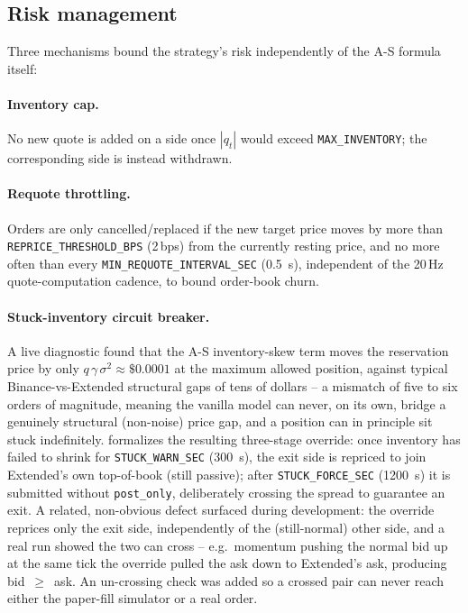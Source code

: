 \documentclass[11pt,a4paper]{article}
\begin{document}
\subsection{Risk management}
\label{sec:risk}

Three mechanisms bound the strategy's risk independently of the A-S formula itself:

\paragraph{Inventory cap.} No new quote is added on a side once $|q_t|$ would exceed
\texttt{MAX\_INVENTORY}; the corresponding side is instead withdrawn.

\paragraph{Requote throttling.} Orders are only cancelled/replaced if the new target price moves
by more than \texttt{REPRICE\_THRESHOLD\_BPS} (2\,bps) from the currently resting price, and no
more often than every \texttt{MIN\_REQUOTE\_INTERVAL\_SEC} (\SI{0.5}{\second}), independent of the
20\,Hz quote-computation cadence, to bound order-book churn.

\paragraph{Stuck-inventory circuit breaker.} A live diagnostic found that the A-S inventory-skew
term moves the reservation price by only $q\,\gamma\,\sigma^{2}\approx\$0.0001$ at the maximum
allowed position, against typical Binance-vs-Extended structural gaps of tens of dollars -- a
mismatch of five to six orders of magnitude, meaning the vanilla model can never, on its own,
bridge a genuinely structural (non-noise) price gap, and a position can in principle sit stuck
indefinitely.  formalizes the resulting three-stage override: once inventory has
failed to shrink for \texttt{STUCK\_WARN\_SEC} (\SI{300}{\second}), the exit side is repriced to
join Extended's own top-of-book (still passive); after \texttt{STUCK\_FORCE\_SEC}
(\SI{1200}{\second}) it is submitted without \texttt{post\_only}, deliberately crossing the
spread to guarantee an exit. A related, non-obvious defect surfaced during development: the
override reprices only the exit side, independently of the (still-normal) other side, and a real
run showed the two can cross -- e.g.\ momentum pushing the normal bid up at the same tick the
override pulled the ask down to Extended's ask, producing bid~$\ge$~ask. An un-crossing check was
added so a crossed pair can never reach either the paper-fill simulator or a real order.
\end{document}
